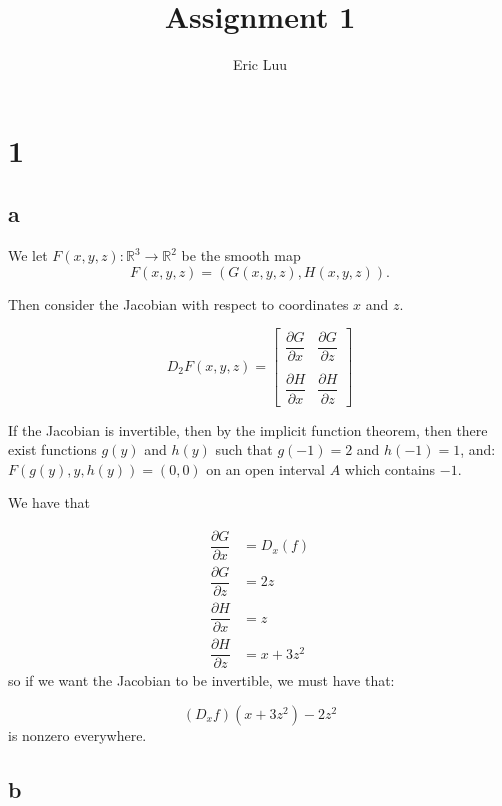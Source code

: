 \documentclass{article}
\title{Assignment 1}
\author{Eric Luu}
\theoremstyle{definition}
\numberwithin{theorem}{section}
\numberwithin{equation}{section}
\begin{document}
\maketitle

\section{1}
\subsection{a}
We let $F(x, y, z) : \mathbb{R}^3 \rightarrow \mathbb{R}^2$ be the smooth map
\begin{equation}
    F(x, y, z) = (G(x, y, z), H(x, y, z)).
\end{equation}

Then consider the Jacobian with respect to coordinates $x$ and $z$. 

\begin{equation}
    D_2 F(x, y, z) = 
    \begin{bmatrix}
        \dfrac{\partial G}{\partial x} & \dfrac{\partial G}{\partial z}\\
        \\
        \dfrac{\partial H}{\partial x} & \dfrac{\partial H}{\partial z}
    \end{bmatrix}
\end{equation}

If the Jacobian is invertible, then by the implicit function theorem, then there exist functions $g(y)$ and $h(y)$ such that $g(-1) = 2$ and $h(-1) = 1$, and:
$F(g(y), y, h(y)) = (0, 0)$ on an open interval $A$ which contains $-1$. 

We have that 

\begin{align*}
    \dfrac{\partial G}{\partial x} &= D_x(f)\\
    \dfrac{\partial G}{\partial z} &= 2z\\
    \dfrac{\partial H}{\partial x} &= z\\
    \dfrac{\partial H}{\partial z} &= x + 3z^2
\end{align*}
so if we want the Jacobian to be invertible, we must have that:

\begin{equation}
    (D_x f)(x + 3 z^2) - 2 z^2
\end{equation}
is nonzero everywhere. 

\subsection{b}
\end{document}
